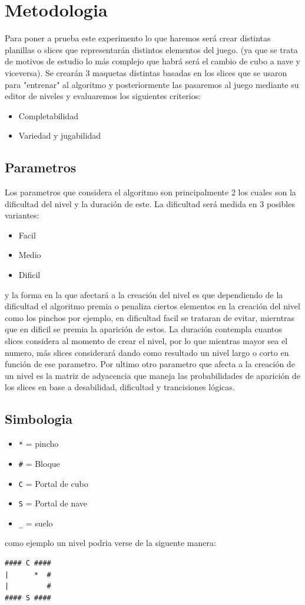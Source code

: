 \documentclass{article}
\begin{document}
\section{Metodologia}
Para poner a prueba este experimento lo que haremos será crear distintas planillas o slices que representarán distintos elementos del juego. (ya que se trata de motivos de estudio lo más complejo que habrá será el cambio de cubo a nave y viceversa). Se crearán 3 maquetas distintas basadas en los slices que se usaron para "entrenar" al algoritmo y posteriormente las pasaremos al juego mediante su editor de niveles y evaluaremos los siguientes criterios:
\begin{itemize}
    \item Completabilidad
    \item Variedad y jugabilidad
\end{itemize}
\subsection{Parametros}
Los parametros que considera el algoritmo son principalmente 2 los cuales son la dificultad del nivel y la duración de este. La dificultad será medida en 3 posibles variantes:
\begin{itemize}
    \item Facil
    \item Medio
    \item Dificil
\end{itemize}
y la forma en la que afectará a la creación del nivel es que dependiendo de la dificultad el algoritmo premia o penaliza ciertos elementos en la creación del nivel como los pinchos por ejemplo, en dificultad facil se trataran de evitar, mierntras que en dificil se premia la aparición de estos.
La duración contempla cuantos slices considera al momento de crear el nivel, por lo que mientras mayor sea el numero, más slices considerará dando como resultado un nivel largo o corto en función de ese parametro. Por ultimo otro parametro que afecta a la creación de un nivel es la matriz de adyacencia que maneja las probabilidades de aparición de los slices en base a desabilidad, dificultad y trancisiones lógicas.
\subsection{Simbologia}
\begin{itemize}
    \item \texttt{*} = pincho
    \item  \texttt{\#} = Bloque
    \item \texttt{C} = Portal de cubo
    \item \texttt{S} = Portal de nave
    \item  \texttt{\_} = suelo
\end{itemize}
como ejemplo un nivel podria verse de la siguente manera:
\begin{lstlisting}
#### C ####
|      *  #
|         #
#### S ####
\end{lstlisting}
\end{document}
